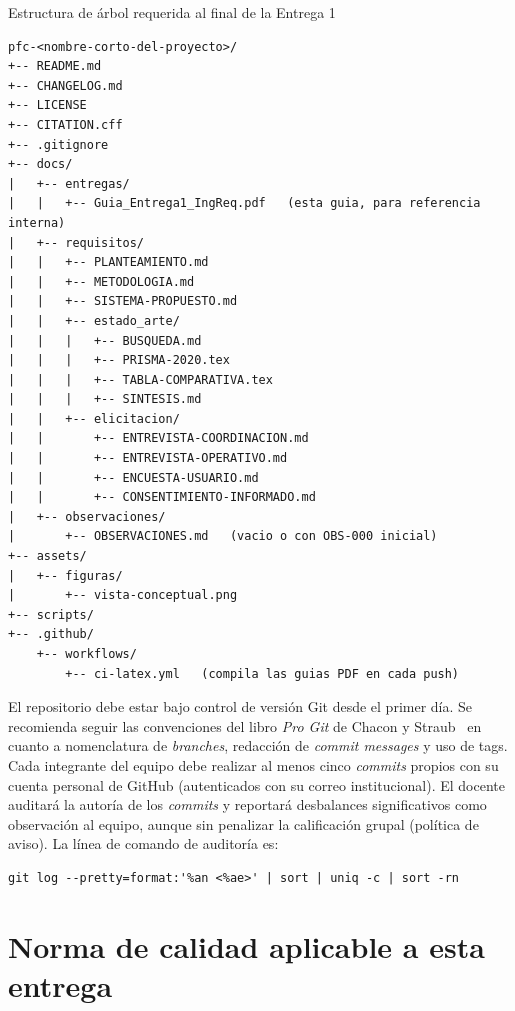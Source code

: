 \documentclass[11pt,a4paper]{article}
\begin{document}
\begin{cajarepo}{Estructura de \'arbol requerida al final de la Entrega 1}
\begin{lstlisting}
pfc-<nombre-corto-del-proyecto>/
+-- README.md
+-- CHANGELOG.md
+-- LICENSE
+-- CITATION.cff
+-- .gitignore
+-- docs/
|   +-- entregas/
|   |   +-- Guia_Entrega1_IngReq.pdf   (esta guia, para referencia interna)
|   +-- requisitos/
|   |   +-- PLANTEAMIENTO.md
|   |   +-- METODOLOGIA.md
|   |   +-- SISTEMA-PROPUESTO.md
|   |   +-- estado_arte/
|   |   |   +-- BUSQUEDA.md
|   |   |   +-- PRISMA-2020.tex
|   |   |   +-- TABLA-COMPARATIVA.tex
|   |   |   +-- SINTESIS.md
|   |   +-- elicitacion/
|   |       +-- ENTREVISTA-COORDINACION.md
|   |       +-- ENTREVISTA-OPERATIVO.md
|   |       +-- ENCUESTA-USUARIO.md
|   |       +-- CONSENTIMIENTO-INFORMADO.md
|   +-- observaciones/
|       +-- OBSERVACIONES.md   (vacio o con OBS-000 inicial)
+-- assets/
|   +-- figuras/
|       +-- vista-conceptual.png
+-- scripts/
+-- .github/
    +-- workflows/
        +-- ci-latex.yml   (compila las guias PDF en cada push)
\end{lstlisting}
\end{cajarepo}

El repositorio debe estar bajo control de versi\'on Git desde el primer d\'ia. Se recomienda seguir las convenciones del libro \emph{Pro Git} de Chacon y Straub~\cite{gitforteams} en cuanto a nomenclatura de \emph{branches}, redacci\'on de \emph{commit messages} y uso de tags. Cada integrante del equipo debe realizar al menos cinco \emph{commits} propios con su cuenta personal de GitHub (autenticados con su correo institucional). El docente auditar\'a la autor\'ia de los \emph{commits} y reportar\'a desbalances significativos como observaci\'on al equipo, aunque sin penalizar la calificaci\'on grupal (pol\'itica de aviso). La l\'inea de comando de auditor\'ia es:

\begin{lstlisting}
git log --pretty=format:'%an <%ae>' | sort | uniq -c | sort -rn
\end{lstlisting}

\section{Norma de calidad aplicable a esta entrega}
\end{document}
